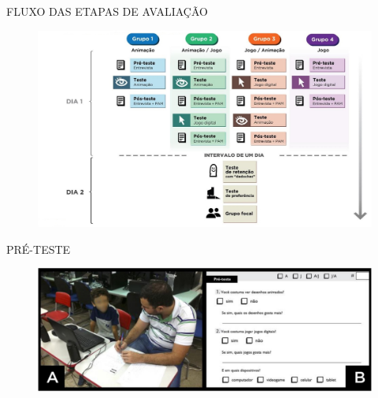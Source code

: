 \documentclass{Alexandre}
\begin{document}
\begin{frame}{FLUXO DAS ETAPAS DE AVALIAÇÃO}
    
    \begin{figure}
        \includegraphics[scale = 0.29]{Figuras/Fluxograma.jpg}
    \end{figure}

\end{frame}


\begin{frame}{PRÉ-TESTE}
    
    \begin{figure}
        \includegraphics[scale = 0.25]{Figuras/pre-teste.jpg}
    \end{figure}

\end{frame}
\end{document}
